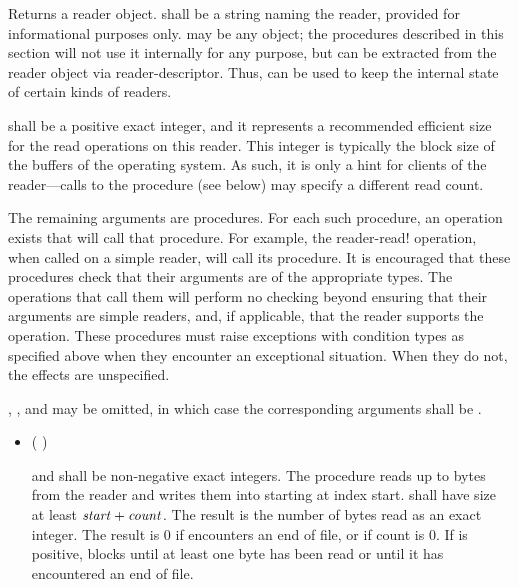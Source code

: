 \begin{entry}{%
}

Returns a reader object.  shall be a string naming the reader,
provided for informational purposes only.  may be any
object; the procedures described in this section will not use it internally for any
purpose, but  can be extracted from the reader object via
{\cf reader-descriptor}. Thus,  can be used to keep the
internal state of certain kinds of readers.
   
 shall be a positive exact integer, and it represents a recommended
efficient size for the read operations on this reader. This integer is typically the
block size of the buffers of the operating system. As such, it is only a
hint for clients of the reader---calls to the  procedure (see below)
may specify a different read count.

The remaining arguments are procedures.  For each such procedure, an
operation exists that will call that procedure.  For example, the {\cf
  reader-read!} operation, when called on a simple reader, will call
its  procedure.
It is encouraged that these procedures check that their arguments are
of the appropriate types.  The operations that call them will perform
no checking beyond ensuring that their  arguments are
simple readers, and, if applicable, that the reader supports the operation.
These procedures must raise
exceptions with condition types as specified above when they encounter an
exceptional situation. When they do not, the effects are unspecified.

, , and  may be
omitted, in which case the corresponding arguments shall be \schfalse.
   
\begin{itemize}
\item {\cf (   )}
       
   and  shall be non-negative exact integers.
  The  procedure
  reads up to  bytes from the reader and writes them
  into  starting at index
  start.  shall have size at least $\var{start} +
  \var{count}$. The result is the number of bytes read as an
  exact integer. The result is 0 if  encounters an end of file, or if
  count is 0. If  is positive,  blocks until at
  least one byte has been read or until it has encountered an end of file.
  

\end{itemize}
\end{entry}
